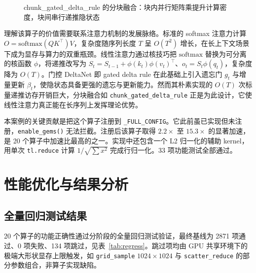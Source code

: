 \begin{figure}[!htbp]
\centering
{}
\caption{chunk\_gated\_delta\_rule 的分块融合：块内并行矩阵乘提升计算密度，块间串行递推隐状态}
\label{fig:chunk}
\end{figure}

理解该算子的价值需要联系注意力机制的发展脉络。标准的 softmax 注意力计算 $O = \mathrm{softmax}(QK^\top)V$，复杂度随序列长度 $T$ 呈 $O(T^2)$ 增长，在长上下文场景下成为显存与算力的双重瓶颈。线性注意力通过核技巧把 $\mathrm{softmax}$ 替换为可分离的核函数 $\phi$，将递推改写为 $S_t = S_{t-1} + \phi(k_t)\phi(v_t)^\top$、$o_t = S_t \phi(q_t)$，复杂度降为 $O(T)$。门控 DeltaNet 即 gated delta rule 在此基础上引入遗忘门 $g_t$ 与增量更新 $\beta_t$，使隐状态具备更强的遗忘与更新能力。然而其朴素实现的 $O(T)$ 次标量递推访存开销巨大，分块融合如 \texttt{chunk\_gated\_delta\_rule} 正是为此设计，它使线性注意力真正能在长序列上发挥理论优势。

本案例的关键贡献是把这个算子注册到 \texttt{\_FULL\_CONFIG}。它此前虽已实现但未注册，\texttt{enable\_gems()} 无法拦截。注册后该算子取得 $2.2\times$ 至 $15.3\times$ 的显著加速，是 20 个算子中加速比最高的之一。实现中还包含一个 L2 归一化的辅助 kernel，用单次 \texttt{tl.reduce} 计算 $1/\sqrt{\sum x^2}$ 完成行归一化。33 项功能测试全部通过。

\section{性能优化与结果分析}

\subsection{全量回归测试结果}
20 个算子的功能正确性通过分阶段的全量回归测试验证，最终基线为 2871 项通过、0 项失败、134 项跳过，见表~\ref{tab:regress}。跳过项均由 GPU 共享环境下的极端大形状显存上限触发，如 \texttt{grid\_sample} $1024\times1024$ 与 \texttt{scatter\_reduce} 的部分参数组合，非算子实现缺陷。

